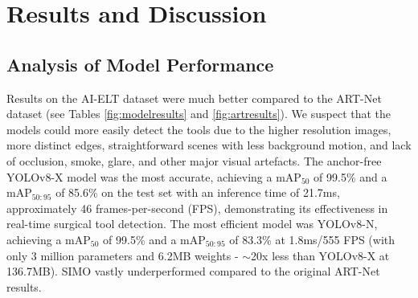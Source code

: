 \section{Results and Discussion}

\subsection{Analysis of Model Performance}

Results on the AI-ELT dataset were much better compared to the ART-Net dataset (see Tables \ref{fig:modelresults} and \ref{fig:artresults}). We suspect that the models could more easily detect the tools due to the higher resolution images, more distinct edges, straightforward scenes with less background motion, and lack of occlusion, smoke, glare, and other major visual artefacts. The anchor-free YOLOv8-X model was the most accurate, achieving a mAP$_{50}$ of 99.5\% and a mAP$_{50:95}$ of 85.6\% on the test set with an inference time of 21.7ms, approximately 46 frames-per-second (FPS), demonstrating its effectiveness in real-time surgical tool detection. The most efficient model was YOLOv8-N, achieving a mAP$_{50}$ of 99.5\% and a mAP$_{50:95}$ of 83.3\% at 1.8ms/555 FPS (with only 3 million parameters and 6.2MB weights - $\sim$20x less than YOLOv8-X at 136.7MB). SIMO vastly underperformed compared to the original ART-Net results.

